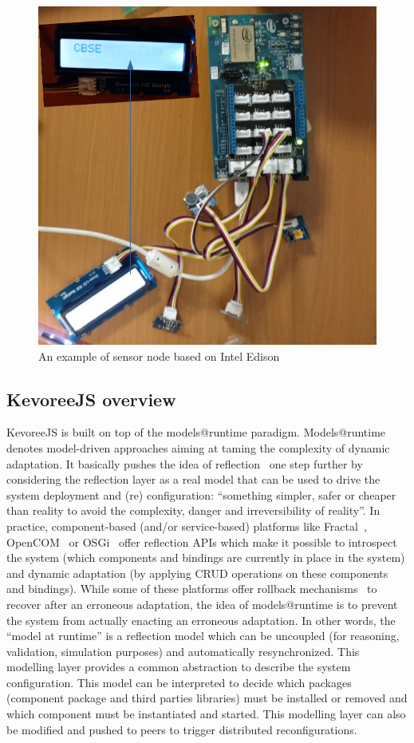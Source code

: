 \begin{figure}[h]
	\centering
	\includegraphics[width=0.8\linewidth]{figures/fig4}
	\caption{An example of sensor node based on Intel Edison}
	\label{fig:fig2}
\end{figure}


\subsection{KevoreeJS overview }
KevoreeJS is built on top of the models@runtime paradigm. Models@runtime denotes model-driven approaches aiming at taming the complexity of dynamic adaptation. It basically pushes the idea of reflection~\cite{DBLP:conf/icse/MorinBNJ09} one step further by considering the reflection layer as a real model that can be used to drive the system deployment and (re) configuration: ``something simpler, safer or cheaper than reality to avoid the complexity, danger and irreversibility of reality''. In practice, component-based (and/or service-based) platforms like Fractal~\cite{bruneton2006fractal}, OpenCOM~\cite{grace2005reflective} or OSGi~\cite{hall2011osgi} offer reflection APIs which make it possible to introspect the system (which components and bindings are currently in place in the system) and dynamic adaptation (by applying CRUD operations on these components and bindings). While some of these platforms offer rollback mechanisms~\cite{david2006safe} to recover after an erroneous adaptation, the idea of models@runtime is to prevent the system from actually enacting an erroneous adaptation. In other words, the ``model at runtime'' is a reflection model which can be uncoupled (for reasoning, validation, simulation purposes) and automatically resynchronized. This modelling layer provides a common abstraction to describe the system configuration. This model can be interpreted to decide which packages (component package and third parties libraries) must be installed or removed and which component must be instantiated and started. This modelling layer can also be  modified and pushed to peers to trigger distributed reconfigurations.

